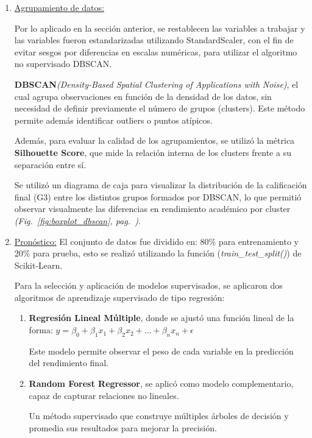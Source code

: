 \documentclass{article}
\begin{document}
\begin{enumerate}
    \item \underline{Agrupamiento de datos:} 
    
    Por lo aplicado en la sección anterior, se restablecen las variables a trabajar y las variables fueron estandarizadas utilizando StandardScaler, con el fin de evitar sesgos por diferencias en escalas numéricas, para utilizar el algoritmo no supervisado DBSCAN.


    \textbf{DBSCAN}\textit{(Density-Based Spatial Clustering of Applications with Noise)}, el cual agrupa observaciones en función de la densidad de los datos, sin necesidad de definir previamente el número de grupos (clusters). Este método permite además identificar outliers o puntos atípicos.

    Además, para evaluar la calidad de los agrupamientos, se utilizó la métrica \textbf{Silhouette Score}, que mide la relación interna de los clusters frente a su separación entre sí.

    Se utilizó un diagrama de caja para visualizar la distribución de la calificación final (G3) entre los distintos grupos formados por DBSCAN, lo que permitió observar visualmente las diferencias en rendimiento académico por cluster {\textit{(Fig.~\ref{fig:boxplot_dbscan}, pag.~\pageref{fig:boxplot_dbscan})}}.

    \item \underline{Pronóstico:} El conjunto de datos fue dividido en: 80\% para entrenamiento y 20\% para prueba, esto se realizó utilizando la función (\textit{train\_test\_split()}) de Scikit-Learn.
    
    
    Para la selección y aplicación de modelos supervisados, se aplicaron dos algoritmos de aprendizaje supervisado de tipo regresión:
    \begin{enumerate}[label=\alph*)]
    \item \textbf{Regresión Lineal Múltiple}, donde se ajustó una función lineal de la forma:
    $y=\beta _{0}+\beta _{1}x_{1}+\beta _{2}x_{2}+...+\beta _{n}x_{n}+\epsilon$
    
    
    Este modelo permite observar el peso de cada variable en la predicción del rendimiento final.

    \item \textbf{Random Forest Regressor}, se aplicó como modelo complementario, capaz de capturar relaciones no lineales.
    
    
    Un método supervisado que construye múltiples árboles de decisión y promedia sus resultados para mejorar la precisión. 
\end{enumerate}



\end{enumerate}
\end{document}
